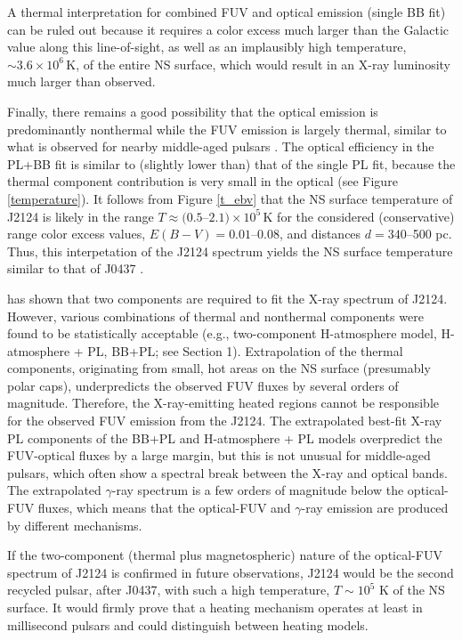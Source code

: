 \documentclass[iop]{emulateapj}
\begin{document}
A thermal interpretation for combined FUV and optical emission (single BB fit) can be ruled out because it requires a color excess much larger  than the  Galactic value along this line-of-sight, as well as an implausibly high temperature, $\sim 3.6\times10^6$\,K, of the entire NS surface, which would result in an X-ray luminosity much larger than observed.
 
Finally, there remains a good possibility that the optical emission is predominantly nonthermal while the FUV emission is largely thermal, similar to what is observed for nearby middle-aged pulsars \citep{2007Ap&SS.308..287K}. The optical efficiency in the PL+BB fit is similar to (slightly lower than) that of the single PL fit, because the thermal component contribution is very small in the optical (see Figure \ref{temperature}). It follows from Figure \ref{t_ebv} that the NS surface temperature of J2124 is likely in the range $T\approx (0.5$--$2.1)\times10^5$\,K for the considered (conservative) range color excess values, $E(B-V)=0.01$--0.08, and distances $d=340$--500 pc. Thus, this interpetation of the J2124 spectrum yields
 the NS surface temperature similar to that of J0437 \citep{2012ApJ...746....6D}. 

\citet{2006ApJ...638..951Z} has shown that two components are required to fit the  X-ray spectrum of J2124. However, various combinations of thermal and nonthermal components were found to be statistically acceptable (e.g., two-component H-atmosphere model, H-atmosphere + PL, BB+PL; see Section 1). Extrapolation of the thermal components, originating from small, hot areas on the NS surface (presumably polar caps), underpredicts the observed FUV fluxes by several orders of magnitude. Therefore, the X-ray-emitting heated regions cannot be responsible for the observed FUV emission from the J2124. The extrapolated best-fit X-ray PL components of the BB+PL and H-atmosphere + PL models overpredict the FUV-optical fluxes by a large margin, but this is not unusual for middle-aged pulsars, which often show a spectral break between the X-ray and optical bands. The extrapolated $\gamma$-ray spectrum is a few orders of magnitude below the optical-FUV fluxes, which means that the optical-FUV and $\gamma$-ray
emission are produced by different mechanisms.

If the two-component (thermal plus magnetospheric) nature of the optical-FUV spectrum of J2124 is confirmed in future observations, J2124 would be the second recycled pulsar, after J0437, with such a high temperature, $T\sim 10^5$ K of the NS surface. It would firmly prove that a heating mechanism operates at least in millisecond pulsars and could distinguish between heating models.
\end{document}

